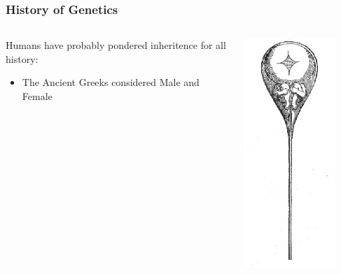 \documentclass{beamer}
\begin{document}
\begin{frame}
	\frametitle{History of Genetics}
	
\begin{columns}[T]
	\begin{column}{.7\textwidth}
			Humans have probably pondered inheritence for all history:
			\vspace{10pt}
			\begin{itemize}
				\item The Ancient Greeks considered Male and Female 
			\end{itemize}
	\end{column}
	\begin{column}{.3\textwidth}
\centering
\includegraphics[keepaspectratio, width  = 0.8\textwidth]{img/homunculous}\footnotemark[1]



\end{column}
\end{columns}
\end{frame}
\end{document}
